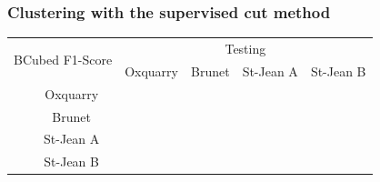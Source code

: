 \subsubsection{Clustering with the supervised cut method}

\begin{table}

  \begin{tabular}{l c c c c c}
    \multicolumn{2}{c}{\multirow{2}{*}{BCubed F1-Score}} & \multicolumn{4}{c}{Testing}\\
    \multicolumn{2}{c}{}                  & Oxquarry & Brunet & St-Jean A & St-Jean B \\
    \parbox[t]{2mm}{}  & Oxquarry  &          &        &           &           \\
                              & Brunet    &          &        &           &           \\
                              & St-Jean A &          &        &           &           \\
                              & St-Jean B &          &        &           &           \\
  \end{tabular}
\end{table}

